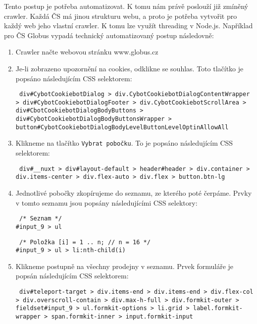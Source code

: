 Tento postup je potřeba automatizovat. K tomu nám právě poslouží již
zmíněný crawler. Každá ČS má jinou strukturu webu, a proto je potřeba
vytvořit pro každý web jeho vlastní crawler. K tomu lze využít threading
v Node.js. Například pro ČS Globus vypadá technický automatizovaný postup
následovně:

\begin{enumerate}
    \item Crawler načte webovou stránku www.globus.cz
    \item Je-li zobrazeno upozornění na cookies, odklikne se souhlas.
        Toto tlačítko je popsáno následujícím CSS selektorem:

        \texttt{
            div\#CybotCookiebotDialog >
            div.CybotCookiebotDialogContentWrapper >
            div\#CybotCookiebotDialogFooter > 
            div.CybotCookiebotScrollArea >
            div\#CbotCookiebotDialogBodyButtons >
            div\#CybotCookiebotDialogBodyButtonsWrapper >
            button#CybotCookiebotDialogBodyLevelButtonLevelOptinAllowAll
        }

    \item Klikneme na tlačítko \texttt{Vybrat pobočku}. To je popsáno
        následujícím CSS selektorem:

        \texttt{
            div\#\_\_nuxt > div\#layout-default > header\#header >
            div.container > div.items-center > div.flex-auto >
            div.flex > button.btn-lg
        }

    \item Jednotlivé pobočky zkopírujeme do seznamu, ze kterého poté
        čerpáme. Prvky v tomto seznamu jsou popsány následujícími CSS
        selektory:

        \texttt{
            /* Seznam */\\
            \#input\_9 > ul
        }

        \texttt{
            /* Položka [i] = 1 .. n; // n = 16 */\\
            \#input\_9 > ul > li:nth-child(i)
        }

    \item Klikneme postupně na všechny prodejny v seznamu. Prvek
        formuláře je popsán následujícím CSS selektorem:

        \texttt{
            div\#teleport-target > div.items-end > div.items-end >
            div.flex-col > div.overscroll-contain > div.max-h-full >
            div.formkit-outer > fieldset\#input_9 > ul.formkit-options >
            li.grid > label.formkit-wrapper > span.formkit-inner >
            input.formkit-input
        }


\end{enumerate}
